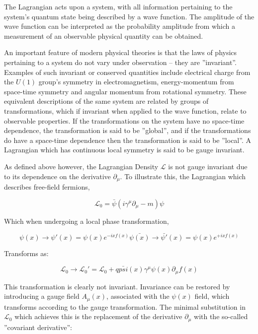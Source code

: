 The Lagrangian acts upon a system, with all information pertaining to the system’s quantum state being described by a wave function. 
The amplitude of the wave function can be interpreted as the probability amplitude from which a measurement of an observable physical quantity can be obtained. 

An important feature of modern physical theories is that the laws of physics pertaining to a system do not vary under observation – they are ''invariant''. 
Examples of such invariant or conserved quantities include electrical charge from the $U(1)$ group’s symmetry in electromagnetism, energy-momentum from space-time symmetry and angular momentum from rotational symmetry. 
These equivalent descriptions of the same system are related by groups of transformations, which if invariant when applied to the wave function, relate to observable properties. 
If the transformations on the system have no space-time dependence, the transformation is said to be ''global'', and if the transformations do have a space-time dependence then the transformation is said to be ''local''. 
A Lagrangian which has continuous local symmetry is said to be gauge invariant. 

As defined above however, the Lagrangian Density $\mathcal{L}$ is not gauge invariant due to its dependence on the derivative $\partial _{\mu}$. To illustrate this, the Lagrangian which describes free-field fermions, 

\begin{equation}
\mathcal{L}_{0} = \bar{\psi}(i\gamma^{\mu}\partial_{\mu} - m)\psi
\end{equation}

Which when undergoing a local phase transformation,

\begin{equation}
\psi(x) \rightarrow \psi'(x) = \psi(x)e^{-ixf(x)}
\bar{\psi(x)} \rightarrow \bar{\psi'}(x) = \psi(x)e^{+ixf(x)}
\end{equation}

Transforms as:

\begin{equation}
\mathcal{L}_{0} \rightarrow \mathcal{L}_{0}' = \mathcal{L}_{0} + q \bar{psi}(x)\gamma^{\mu}\psi(x)\partial_{\mu}f(x)
\end{equation}

This transformation is clearly not invariant. Invariance can be restored by introducing a gauge field $A_{\mu}(x)$, associated with the $\psi(x)$ field, which transforms according to the gauge transformation. 
The minimal substitution in $\mathcal{L}_{0}$ which achieves this is the replacement of the derivative $\partial_{\mu}$  with the so-called ''covariant derivative'':

